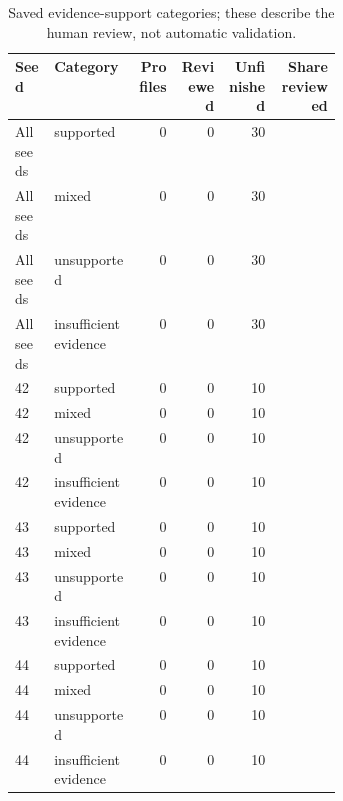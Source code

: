 \begin{table}[htbp!]
\centering
\small
\setlength{\tabcolsep}{3pt}
\renewcommand{\arraystretch}{1.1}
\begin{tabular}{p{0.12\linewidth}p{0.26\linewidth}rrrr}
\hline
Seed & Category & Profiles & Reviewed & Unfinished & Share reviewed \\
\hline
All seeds & supported & 0 & 0 & 30 & \textemdash{} \\
All seeds & mixed & 0 & 0 & 30 & \textemdash{} \\
All seeds & unsupported & 0 & 0 & 30 & \textemdash{} \\
All seeds & insufficient evidence & 0 & 0 & 30 & \textemdash{} \\
42 & supported & 0 & 0 & 10 & \textemdash{} \\
42 & mixed & 0 & 0 & 10 & \textemdash{} \\
42 & unsupported & 0 & 0 & 10 & \textemdash{} \\
42 & insufficient evidence & 0 & 0 & 10 & \textemdash{} \\
43 & supported & 0 & 0 & 10 & \textemdash{} \\
43 & mixed & 0 & 0 & 10 & \textemdash{} \\
43 & unsupported & 0 & 0 & 10 & \textemdash{} \\
43 & insufficient evidence & 0 & 0 & 10 & \textemdash{} \\
44 & supported & 0 & 0 & 10 & \textemdash{} \\
44 & mixed & 0 & 0 & 10 & \textemdash{} \\
44 & unsupported & 0 & 0 & 10 & \textemdash{} \\
44 & insufficient evidence & 0 & 0 & 10 & \textemdash{} \\
\hline
\end{tabular}
\caption{Saved evidence-support categories; these describe the human review, not automatic validation.}
\label{chap:results:tab:rq3_profile_review_support}
\end{table}
